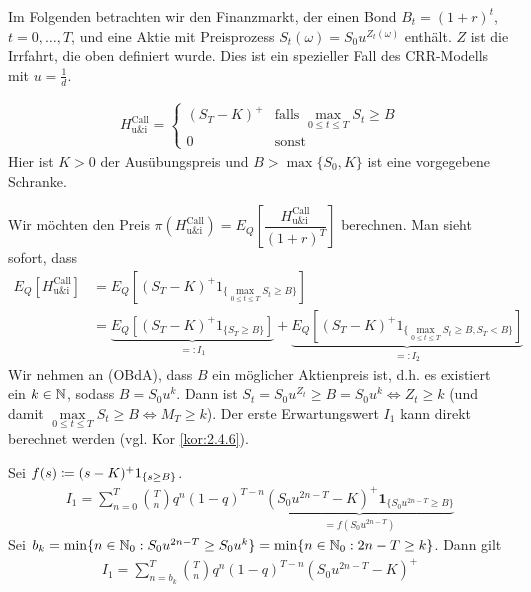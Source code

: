 \documentclass[a4paper,twoside,DIV15,BCOR12mm]{scrbook}
\begin{document}
Im Folgenden betrachten wir den Finanzmarkt, der einen Bond $B_t=(1+r)^t$, $t=0,\ldots,T$, und eine Aktie mit Preisprozess $S_t(\omega)=S_0u^{Z_t(\omega)}$ enthält. $Z$ ist die Irrfahrt, die oben definiert wurde. Dies ist ein spezieller Fall des CRR-Modells mit $u=\frac {1}{d}$.
\begin{beispiel}
\begin{align*}
H_{\text{u\&i}}^{\text{Call}} = 
\begin{cases}
(S_T-K)^+ & \text{falls }\max_{0\le t\le T}S_t \ge B \\
0 & \text{sonst}
\end{cases}
\end{align*}
Hier ist $K>0$ der Ausübungspreis und $B> \max\{S_0,K\}$ ist eine vorgegebene Schranke.

Wir möchten den Preis $\pi(H_{\text{u\&i}}^{\text{Call}})=E_Q\left[\dfrac{H_{\text{u\&i}}^{\text{Call}}}{(1+r)^T}\right]$ berechnen. Man sieht sofort, dass
\begin{align*}
E_Q[H_{\text{u\&i}}^{\text{Call}}]&=E_Q[(S_T-K)^+ 1_{\{\max\limits_{0\le t\le T} S_t\ge B\}}]\\
&=\underbrace{E_Q[(S_T-K)^+1_{\{S_T\ge B\}}]}_{=:I_1}+\underbrace{E_Q[(S_T-K)^+ 1_{\{\max\limits_{0\le t\le T} S_t\ge B,S_T<B\}}]}_{=:I_2}
\end{align*}
Wir nehmen an (OBdA), dass $B$ ein möglicher Aktienpreis ist, d.h. es existiert ein $k\in\mathbb{N}$, sodass $B=S_0u^k$. Dann ist $S_t=S_0u^{Z_t} \ge B=S_0u^k\iff Z_t\ge k$ (und damit $\max\limits_{0\le t\le T} S_t \ge B \iff M_T\ge k$).
Der erste Erwartungswert $I_1$ kann direkt berechnet werden (vgl. Kor \ref{kor:2.4.6}).

Sei $f(s)\da(s-K)^+1_{\{s\ge B\}}$.
\begin{align*}
I_1=\sum\limits_{n=0}^T {T\choose n} q^n (1-q)^{T-n} \underbrace{(S_0u^{2n-T}-K)^+ \mathbf{1}_{\{S_0u^{2n-T}\geq B\}} }_{=f(S_0u^{2n-T})}
\end{align*}
Sei $b_k=\min\{n\in\mathbb{N}_0:S_0u^{2n-T}\ge S_0u^k\}=\min\{n\in\mathbb{N}_0:2n-T\ge k\}$. Dann gilt
\begin{align*}
I_1=\sum\limits_{n=b_k}^T {T\choose n} q^n (1-q)^{T-n} (S_0u^{2n-T}-K)^+
\end{align*}


\end{beispiel}
\end{document}
